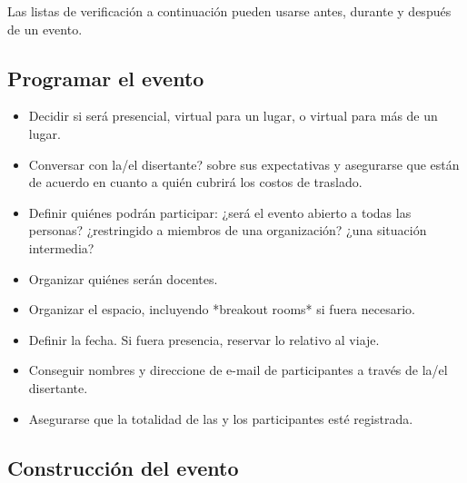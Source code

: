 
Las listas de verificación a continuación pueden usarse antes, durante y después de un evento.

\subsection*{Programar el evento}

\begin{itemize}

\item
  Decidir si será presencial,
  virtual para un lugar,
  o virtual para más de un lugar.

\item
  Conversar con la/el disertante? sobre sus expectativas
  y asegurarse que están de acuerdo en cuanto a quién cubrirá los costos de traslado.

\item
  Definir quiénes podrán participar:
  ¿será el evento abierto a todas las personas?
  ¿restringido a miembros de una organización?
  ¿una situación intermedia?

\item
  Organizar quiénes serán docentes.

\item
  Organizar el espacio, incluyendo *breakout rooms* si fuera necesario.

\item
  Definir la fecha.
  Si fuera presencia, reservar lo relativo al viaje.

\item
  Conseguir nombres y direccione de e-mail de participantes a través de la/el disertante.

\item
  Asegurarse que la totalidad de las y los participantes esté registrada.

\end{itemize}

\subsection*{Construcción del evento}

